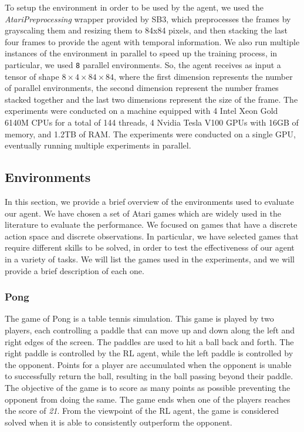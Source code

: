 To setup the environment in order to be used by the agent, we used the \textit{AtariPreprocessing} wrapper provided by SB3, which preprocesses the frames by grayscaling them and resizing them to 84x84 pixels, and then stacking the last four frames to provide the agent with temporal information.
We also run multiple instances of the environment in parallel to speed up the training process, in particular, we used \texttt{8} parallel environments.
So, the agent receives as input a tensor of shape $8 \times 4 \times 84 \times 84$, where the first dimension represents the number of parallel environments, the second dimension represent the number frames stacked together and the last two dimensions represent the size of the frame.
The experiments were conducted on a machine equipped with 4 Intel Xeon Gold 6140M CPUs for a total of 144 threads, 4 Nvidia Tesla V100 GPUs with 16GB of memory, and 1.2TB of RAM\@.
The experiments were conducted on a single GPU, eventually running multiple experiments in parallel.


\subsection{Environments}
\label{subsec:environments}
In this section, we provide a brief overview of the environments used to evaluate our agent.
We have chosen a set of Atari games which are widely used in the literature to evaluate the performance.
We focused on games that have a discrete action space and discrete observations.
In particular, we have selected games that require different skills to be solved, in order to test the effectiveness of our agent in a variety of tasks.
We will list the games used in the experiments, and we will provide a brief description of each one.

\subsubsection{Pong}
The game of Pong is a table tennis simulation.
This game is played by two players, each controlling a paddle that can move up and down along the left and right edges of the screen.
The paddles are used to hit a ball back and forth.
The right paddle is controlled by the RL agent, while the left paddle is controlled by the opponent.
Points for a player are accumulated when the opponent is unable to successfully return the ball, resulting in the ball passing beyond their paddle.
The objective of the game is to score as many points as possible preventing the opponent from doing the same.
The game ends when one of the players reaches the score of \textit{21}.
From the viewpoint of the RL agent, the game is considered solved when it is able to consistently outperform the opponent.


